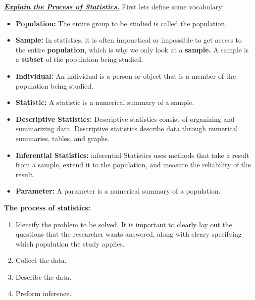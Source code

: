 \documentclass{report}
\begin{document}
        \bigbreak \noindent \bigbreak \noindent 
        \textbf{\textit{\underline{Explain the Process of Statistics.}}}
        \bigbreak \noindent 
        First lets define some vocabulary:
        \begin{itemize}
            \item \textbf{Population:} The entire group to be studied is called the population.
            \item \textbf{Sample:} In statistics, it is often impractical or impossible to get access to the entire \textbf{population}, which is why we only look at a \textbf{sample.} A sample is a \textbf{subset} of the population being studied.
            \item \textbf{Individual:} An individual is a person or object that is a member of the population being studied.
            \item \textbf{Statistic:} A statistic is a numerical summary of a sample.
            \item \textbf{Descriptive Statistics:} Descriptive statistics consist of organizing and summarizing data. Descriptive statistics describe data through numerical summaries, tables, and graphs.
            \item \textbf{Inferential Statistics:} inferential Statistics uses methods that take a result from a sample, extend it to the population, and measure the reliability of the result.
            \item \textbf{Parameter:} A parameter is a numerical summary of a population.
        \end{itemize}

        \bigbreak \noindent 
        \textbf{The process of statistics:}
        \begin{enumerate}
            \item Identify the problem to be solved. It is important to clearly lay out the questions that the researcher wants answered, along with cleary specifying which populution the study applies.
            \item Collect the data.
            \item Describe the data.
            \item Preform inference.
        \end{enumerate}
\end{document}
